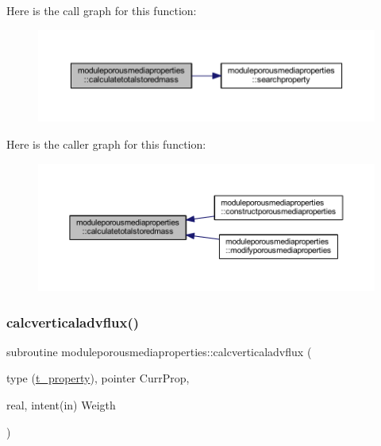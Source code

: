 Here is the call graph for this function\+:\nopagebreak
\begin{figure}[H]
\begin{center}
\leavevmode
\includegraphics[width=350pt]{namespacemoduleporousmediaproperties_a39cd5689166d641ddb0f961d291c6061_cgraph}
\end{center}
\end{figure}
Here is the caller graph for this function\+:\nopagebreak
\begin{figure}[H]
\begin{center}
\leavevmode
\includegraphics[width=350pt]{namespacemoduleporousmediaproperties_a39cd5689166d641ddb0f961d291c6061_icgraph}
\end{center}
\end{figure}
\mbox{\label{namespacemoduleporousmediaproperties_a073f545385ee87d0157436c464e871fa}} 
\subsubsection{\texorpdfstring{calcverticaladvflux()}{calcverticaladvflux()}}
{\footnotesize\ttfamily subroutine moduleporousmediaproperties\+::calcverticaladvflux (\begin{DoxyParamCaption}\item[{type (\mbox{\hyperlink{structmoduleporousmediaproperties_1_1t__property}{t\+\_\+property}}), pointer}]{Curr\+Prop,  }\item[{real, intent(in)}]{Weigth }\end{DoxyParamCaption})\hspace{0.3cm}{\ttfamily [private]}}

